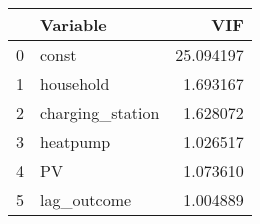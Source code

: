\begin{tabular}{llr}
\toprule
 & Variable & VIF \\
\midrule
0 & const & 25.094197 \\
1 & household & 1.693167 \\
2 & charging_station & 1.628072 \\
3 & heatpump & 1.026517 \\
4 & PV & 1.073610 \\
5 & lag_outcome & 1.004889 \\
\bottomrule
\end{tabular}
